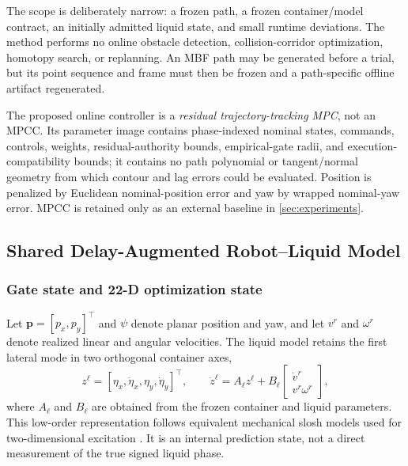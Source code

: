 The scope is deliberately narrow: a frozen path, a frozen container/model
contract, an initially admitted liquid state, and small runtime deviations.
The method performs no online obstacle detection, collision-corridor
optimization, homotopy search, or replanning.  An MBF path may be generated
before a trial, but its point sequence and frame must then be frozen and a
path-specific offline artifact regenerated.

The proposed online controller is a \emph{residual trajectory-tracking MPC},
not an MPCC.  Its parameter image contains phase-indexed nominal states,
commands, controls, weights, residual-authority bounds, empirical-gate radii,
and execution-compatibility bounds; it contains no path
polynomial or tangent/normal geometry from which contour and lag errors could
be evaluated.  Position is penalized by Euclidean nominal-position error and
yaw by wrapped nominal-yaw error.  MPCC is retained only as an external
baseline in \cref{sec:experiments}.

\subsection{Shared Delay-Augmented Robot--Liquid Model}

\subsubsection{Gate state and 22-D optimization state}

Let $\bm p=[p_x,p_y]^\top$ and $\psi$ denote planar position and yaw, and let
$v^r$ and $\omega^r$ denote realized linear and angular velocities.  The
liquid model retains the first lateral mode in two orthogonal container axes,
\begin{equation}
  z^\ell=
  [\eta_x,\dot\eta_x,\eta_y,\dot\eta_y]^\top,
  \qquad
  \dot z^\ell=A_\ell z^\ell+B_\ell
  \begin{bmatrix}\dot v^r\\v^r\omega^r\end{bmatrix},
  \label{eq:liquid_model}
\end{equation}
where $A_\ell$ and $B_\ell$ are obtained from the frozen container and liquid
parameters.  This low-order representation follows equivalent mechanical
slosh models used for two-dimensional excitation
\cite{A01_Leva2021,A02_Guagliumi2021}.  It is an internal prediction state,
not a direct measurement of the true signed liquid phase.

